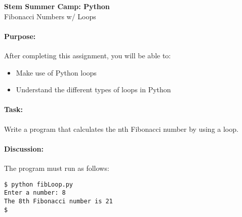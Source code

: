 \documentclass[11pt]{article}
\begin{document}
    \begin{center}

        \large\textbf{Stem Summer Camp: Python} \\
        Fibonacci Numbers w/ Loops \\

    \end{center}

    \paragraph{Purpose:} After completing this assignment, you will be
    able to:

        \begin{itemize}

            \item Make use of Python loops

            \item Understand the different types of loops in Python

        \end{itemize}

    \paragraph{Task:} Write a program that calculates the nth Fibonacci
    number by using a loop.  
    
    \paragraph{Discussion:} The program must run as follows:
    
    \vspace{1.5em}

\begin{verbatim}
$ python fibLoop.py
Enter a number: 8
The 8th Fibonacci number is 21
$
\end{verbatim}
\end{document}
